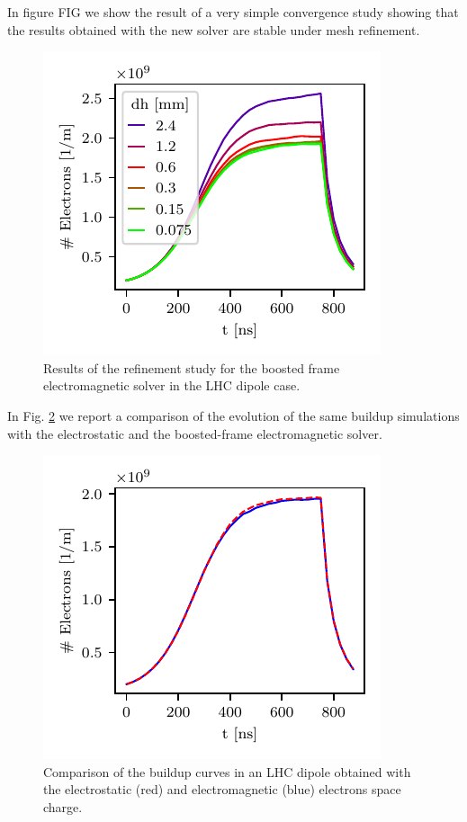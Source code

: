 In figure FIG we show the result of a very simple convergence study showing that the results obtained with the new solver are stable under mesh refinement.
\begin{figure}
    \centering
    \includegraphics[scale = 1.4]{chapters/Chapter1/Figures/scan_dh.pdf}
    \caption{Results of the refinement study for the boosted frame electromagnetic solver in the LHC dipole case.}
    \label{fig:my_label}
\end{figure}
In Fig. \ref{fig:em_vs_es_dipole} we report a comparison of the evolution of the same buildup simulations with the electrostatic and the boosted-frame electromagnetic solver. 
\begin{figure}
    \centering
    \includegraphics[scale=1.4]{chapters/Chapter1/Figures/em_es_comparison.pdf}
    \caption{Comparison of the buildup curves in an LHC dipole obtained with the electrostatic (red) and electromagnetic (blue) electrons space charge.}
    \label{fig:em_vs_es_dipole}
\end{figure}
